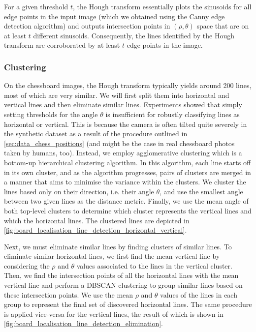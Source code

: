 \documentclass[../main.tex]{subfiles}
\begin{document}
For a given threshold $t$, the Hough transform essentially plots the sinusoids for all edge points in the input image (which we obtained using the Canny edge detection algorithm) and outputs intersection points in $(\rho,\theta)$ space that are on at least $t$ different sinusoids.
Consequently, the lines identified by the Hough transform are corroborated by at least $t$ edge points in the image.

\subsubsection{Clustering}
On the chessboard images, the Hough transform typically yields around 200 lines, most of which are very similar. 
We will first split them into horizontal and vertical lines and then eliminate similar lines.
Experiments showed that simply setting thresholds for the angle $\theta$ is insufficient for robustly classifying lines as horizontal or vertical.
This is because the camera is often tilted quite severely in the synthetic dataset as a result of the procedure outlined in \cref{sec:data_chess_positions} (and might be the case in real chessboard photos taken by humans, too).
Instead, we employ agglomerative clustering which is a bottom-up hierarchical clustering algorithm.
In this algorithm, each line starts off in its own cluster, and as the algorithm progresses, pairs of clusters are merged in a manner that aims to minimise the variance within the clusters.
We cluster the lines based only on their direction, i.e. their angle $\theta$, and use the smallest angle between two given lines as the distance metric.
Finally, we use the mean angle of both top-level clusters to determine which cluster represents the vertical lines and which the horizontal lines.
The clustered lines are depicted in \cref{fig:board_localisation_line_detection_horizontal_vertical}.

Next, we must eliminate similar lines by finding clusters of similar lines.
To eliminate similar horizontal lines, we first find the mean vertical line by considering the $\rho$ and $\theta$ values associated to the lines in the vertical cluster.
Then, we find the intersection points of all the horizontal lines with the mean vertical line and perform a DBSCAN clustering \cite{ester1996} to group similar lines based on these intersection points.
We use the mean $\rho$ and $\theta$ values of the lines in each group to represent the final set of discovered horizontal lines. 
The same procedure is applied vice-versa for the vertical lines, the result of which is shown in \cref{fig:board_localisation_line_detection_elimination}.
\end{document}
